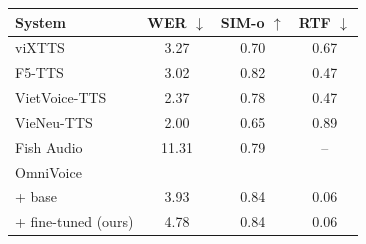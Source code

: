 \small
\begin{tabular}{lccc}
\toprule
System & \textbf{WER} $\downarrow$ & \textbf{SIM-o} $\uparrow$ & \textbf{RTF} $\downarrow$ \\
\midrule
viXTTS                       & 3.27 & 0.70 & 0.67 \\
F5-TTS                       & 3.02 & 0.82 & 0.47 \\
VietVoice-TTS                & 2.37 & 0.78 & 0.47 \\
VieNeu-TTS                   & 2.00 & 0.65 & 0.89 \\
Fish Audio                   & 11.31 & 0.79 & -- \\
\midrule
OmniVoice                    &      &      &      \\
\quad + base                 & 3.93 & 0.84 & 0.06 \\
\quad + fine-tuned (ours)    & 4.78 & 0.84 & 0.06 \\
\bottomrule
\end{tabular}
